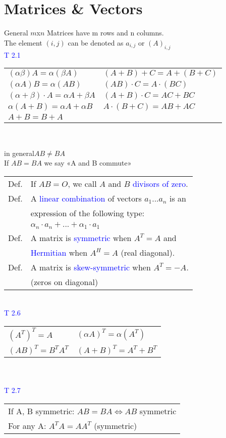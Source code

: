 \section{Matrices \& Vectors}
\begin{mainbox}{General}
$m$x$n$ Matrices have m rows and n columns.\\
The element $(i,j)$ can be denoted as $a_{i,j}$ or $(A)_{i,j}$
\smallskip\\
\textcolor{blue}{T 2.1}\\
\begin{tabular}{ll}
	$(\alpha\beta)A = \alpha(\beta A)$ & $(A+B)+C = A+(B+C)$ \\
	$(\alpha A)B = \alpha(AB)$ & $(AB)\cdot C = A\cdot (BC)$ \\
	$(\alpha + \beta)\cdot A = \alpha A + \beta A$ & $(A+B)\cdot C = AC + BC$ \\
	$\alpha (A+B) = \alpha A + \alpha B$ & $A\cdot (B+C) = AB+AC$ \\
	$A+B = B+A$ & \\
\end{tabular}\\
{\par\centering\danger in general$AB \neq BA$\\
If $AB = BA$ we say «A and B commute»\par}
\medskip

\begin{tabular}{ll}
	Def. & If $AB = O$, we call $A$ and $B$ \textcolor{blue}{divisors of zero}.\\
	Def. & A \textcolor{blue}{linear combination} of vectors $a_1 ... a_n$ is an\\
 	& expression of the following type:\\
 	& $\alpha_n\cdot a_n + ... + \alpha_1\cdot a_1$\\
	Def. & A matrix is \textcolor{blue}{symmetric} when $A^T = A$ and \\
	&  \textcolor{blue}{Hermitian} when $A^H = A$ (real diagonal).\\
	Def. & A matrix is \textcolor{blue}{skew-symmetric} when $A^T = -A$.\\
	& (zeros on diagonal) \\
\end{tabular}
\smallskip\\
\textcolor{blue}{T 2.6}\\
\begin{tabular}{ll}
	$(A^T)^T = A$ & $(\alpha A)^T = \alpha(A^T)$ \\
	$(AB)^T = B^TA^T$ & $(A+B)^T = A^T + B^T$ \\
\end{tabular}\\
\smallskip\\
\textcolor{blue}{T 2.7}\\
\begin{tabular}{l}
	If A, B symmetric: $AB = BA \Leftrightarrow AB$ symmetric\\
	For any A: $A^TA = AA^T$ (symmetric)\\
\end{tabular}
\end{mainbox}

